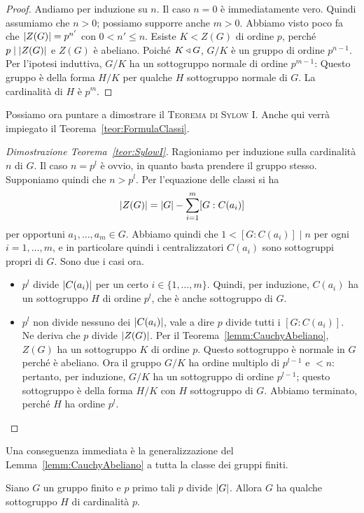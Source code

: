 \begin{proof}
Andiamo per induzione su $n$. Il caso $n=0$ è immediatamente vero. Quindi assumiamo che $n>0$; possiamo supporre anche $m>0$. Abbiamo visto poco fa che $\left\lvert Z(G)\right\rvert=p^{n'}$ con $0 < n' \le n$. Esiste $K < Z(G)$ di ordine $p$, perché $p\mid\left\lvert Z(G)\right\rvert$ e $Z(G)$ è abeliano. Poiché $K \triangleleft G$, $G/K$ è un gruppo di ordine $p^{n-1}$. Per l'ipotesi induttiva, $G/K$ ha un sottogruppo normale di ordine $p^{m-1}$: Questo gruppo è della forma $H/K$ per qualche $H$ sottogruppo normale di $G$. La cardinalità di $H$ è $p^m$.
\end{proof}

Possiamo ora puntare a dimostrare il {\scshape Teorema di Sylow I}. Anche qui verrà impiegato il Teorema~\ref{teor:FormulaClassi}.

\begin{proof}[Dimostrazione Teorema~\ref{teor:SylowI}]
Ragioniamo per induzione sulla cardinalità $n$ di $G$. Il caso $n = p^l$ è ovvio, in quanto basta prendere il gruppo stesso. Supponiamo quindi che $n>p^l$. Per l'equazione delle classi si ha
\[
\left\lvert Z(G)\right\rvert=\left\lvert G\right\rvert-\sum_{i=1}^m [G: C(a_i)]
\]
per opportuni $a_1, \dots{}, a_m \in G$. Abbiamo quindi che $1<[G: C(a_i)] \mid n$ per ogni $i=1,\dots,m$, e in particolare quindi i centralizzatori $ C(a_i)$ sono sottogruppi propri di $G$. Sono due i casi ora.
\begin{itemize}
\item $p^l$ divide $\left\lvert C(a_i)\right\rvert$ per un certo $i \in \{1, \dots{}, m\}$. Quindi, per induzione, $ C(a_i)$ ha un sottogruppo $H$ di ordine $p^l$, che è anche sottogruppo di $G$.
\item $p^l$ non divide nessuno dei $\left\lvert C(a_i)\right\rvert$, vale a dire $p$ divide tutti i $[G: C(a_i)]$. Ne deriva che $p$ divide $\left\lvert Z(G)\right\rvert$. Per il Teorema~\ref{lemm:CauchyAbeliano}, $Z(G)$ ha un sottogruppo $K$ di ordine $p$. Questo sottogruppo è normale in $G$ perché è abeliano. Ora il gruppo $G/K$ ha ordine multiplo di $p^{l-1}$ e $< n$: pertanto, per induzione, $G/K$ ha un sottogruppo di ordine $p^{l-1}$; questo sottogruppo è della forma $H/K$ con $H$ sottogruppo di $G$. Abbiamo terminato, perché $H$ ha ordine $p^l$.\qedhere
\end{itemize}
\end{proof}

Una conseguenza immediata è la generalizzazione del Lemma~\ref{lemm:CauchyAbeliano} a tutta la classe dei gruppi finiti.

\begin{coro}\label{coro:Cauchy}
Siano $G$ un gruppo finito e $p$ primo tali $p$ divide $\left\lvert G\right\rvert$. Allora $G$ ha qualche sottogruppo $H$ di cardinalità $p$.
\end{coro}

